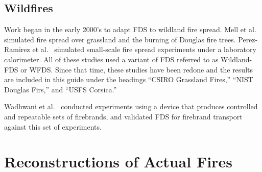 \subsection{Wildfires}

Work began in the early 2000's to adapt FDS to wildland fire spread. Mell et al.~\cite{Mell:IJWF2007,Mell:2009} simulated fire spread over grassland and the burning of Douglas fire trees. Perez-Ramirez et al.~\cite{Perez-Ramirez:FT2017} simulated small-scale fire spread experiments under a laboratory calorimeter. All of these studies used a variant of FDS referred to as Wildland-FDS or WFDS. Since that time, these studies have been redone and the results are included in this guide under the headings ``CSIRO Grassland Fires,'' ``NIST Douglas Firs,'' and ``USFS Corsica.''

Wadhwani et al.~\cite{Wadhwani:IJWF2022,Wadhwani:FSJ2017} conducted experiments using a device that produces controlled and repeatable sets of firebrands, and validated FDS for firebrand transport against this set of experiments.


\section{Reconstructions of Actual Fires}


